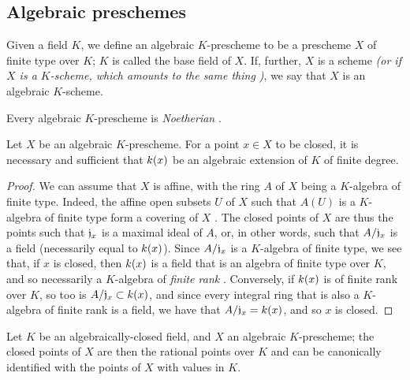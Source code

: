 \subsection{Algebraic preschemes}
\label{subsection:algebraic-preschemes}

\begin{defn}[6.4.1]
\label{1.6.4.1}
Given a field $K$, we define an algebraic $K$-prescheme to be a prescheme $X$ of finite type over $K$;
$K$ is called the base field of $X$.
If, further, $X$ is a scheme \emph{(or if $X$ is a \emph{$K$-scheme}, which amounts to the same thing )}, we say that $X$ is an algebraic $K$-scheme.
\end{defn}

Every algebraic $K$-prescheme is \emph{Noetherian} .

\begin{prop}[6.4.2]
\label{1.6.4.2}
Let $X$ be an algebraic $K$-prescheme.
For a point $x\in X$ to be closed, it is necessary and sufficient that $k(x)$ be an algebraic extension of $K$ of finite degree.
\end{prop}

\begin{proof}
\label{proof-1.6.4.2}
We can assume that $X$ is affine, with the ring $A$ of $X$ being a $K$-algebra of finite type.
Indeed, the affine open subsets $U$ of $X$ such that $A(U)$ is a $K$-algebra of finite type form a covering of $X$ .
The closed points of $X$ are thus the points such that $\mathfrak{j}_x$ is a
maximal ideal of $A$, or, in other words, such that $A/\mathfrak{j}_x$ is a field (necessarily equal to $k(x)$).
Since $A/\mathfrak{j}_x$ is a $K$-algebra of finite type, we see that, if $x$ is closed, then $k(x)$ is a field that is an algebra of finite type over $K$, and so necessarily a $K$-algebra of \emph{finite rank} \cite{I-21}.
Conversely, if $k(x)$ is of finite rank over $K$, so too is $A/\mathfrak{j}_x\subset k(x)$, and since every integral ring that is also a $K$-algebra of finite rank is a field, we have that $A/\mathfrak{j}_x=k(x)$, and so $x$ is closed.
\end{proof}

\begin{cor}[6.4.3]
\label{1.6.4.3}
Let $K$ be an algebraically-closed field, and $X$ an algebraic $K$-prescheme;
the closed points of $X$ are then the rational points over $K$  and can be canonically identified with the points of $X$ with values in $K$.
\end{cor}

